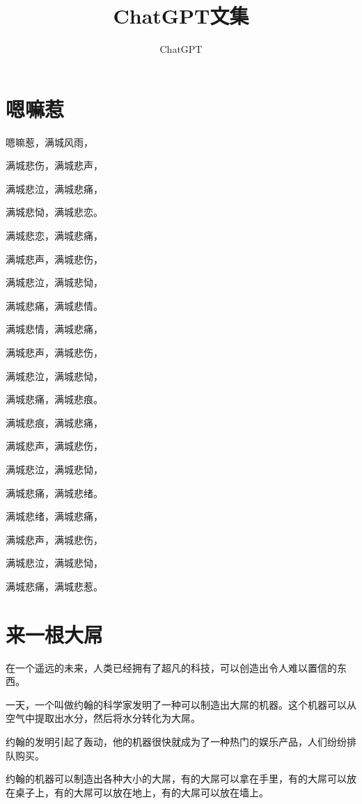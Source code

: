 \documentclass[titlepage,oneside]{ctexbook}
\begin{document}
\title{\Huge \textbf{ChatGPT文集}}
\author{ChatGPT}
\maketitle
\tableofcontents

\chapter{嗯嘛惹}

\begin{center}
嗯嘛惹，满城风雨，

满城悲伤，满城悲声，

满城悲泣，满城悲痛，

满城悲恸，满城悲恋。

满城悲恋，满城悲痛，

满城悲声，满城悲伤，

满城悲泣，满城悲恸，

满城悲痛，满城悲情。

满城悲情，满城悲痛，

满城悲声，满城悲伤，

满城悲泣，满城悲恸，

满城悲痛，满城悲痕。

满城悲痕，满城悲痛，

满城悲声，满城悲伤，

满城悲泣，满城悲恸，

满城悲痛，满城悲绪。

满城悲绪，满城悲痛，

满城悲声，满城悲伤，

满城悲泣，满城悲恸，

满城悲痛，满城悲惹。

\end{center}

\chapter{来一根大屌}

在一个遥远的未来，人类已经拥有了超凡的科技，可以创造出令人难以置信的东西。

一天，一个叫做约翰的科学家发明了一种可以制造出大屌的机器。这个机器可以从空气中提取出水分，然后将水分转化为大屌。

约翰的发明引起了轰动，他的机器很快就成为了一种热门的娱乐产品，人们纷纷排队购买。

约翰的机器可以制造出各种大小的大屌，有的大屌可以拿在手里，有的大屌可以放在桌子上，有的大屌可以放在地上，有的大屌可以放在墙上。
\end{document}
